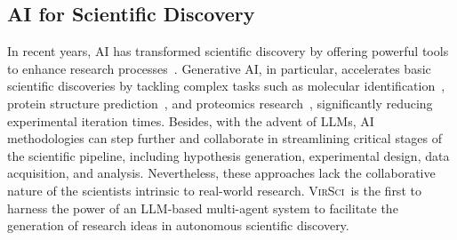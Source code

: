 \documentclass[11pt]{article}
\def\modelname{\textsc{VirSci\xspace}}
\def\etc{{\textit{etc}\xspace}}
\begin{document}
\subsection{AI for Scientific Discovery}
In recent years, AI has transformed scientific discovery by offering powerful tools to enhance research processes~\citep{xu2021artificial}. 
Generative AI, in particular, accelerates basic scientific discoveries by tackling complex tasks such as molecular identification~\citep{vignac2022digress}, protein structure prediction~\citep{abramson2024accurate}, and proteomics research~\citep{ding2024automating}, significantly reducing experimental iteration times.
Besides, with the advent of LLMs, AI methodologies can step further and collaborate in streamlining critical stages of the scientific pipeline, including hypothesis generation, experimental design, data acquisition, and analysis\citep{zheng2023large, wang2023scientific, miret2024llms, wysocki2024llm, lu2024ai, si2024can}.
Nevertheless, these approaches lack the collaborative nature of the scientists intrinsic to real-world research.
\modelname\ is the first to harness the power of an LLM-based multi-agent system to facilitate the generation of research ideas in autonomous scientific discovery.
\end{document}

